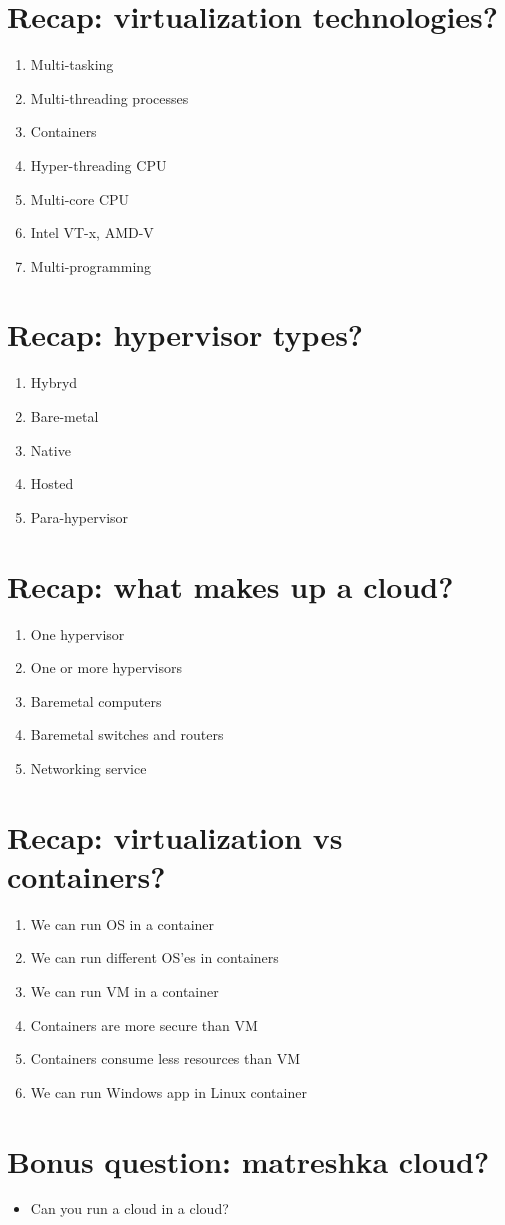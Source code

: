 \documentclass[11pt]{article}
\begin{document}
\section*{Recap: virtualization technologies?}
\label{sec:orgd8e064c}
\begin{enumerate}
\item Multi-tasking
\item Multi-threading processes
\item Containers
\item Hyper-threading CPU
\item Multi-core CPU
\item Intel VT-x, AMD-V
\item Multi-programming
\end{enumerate}

\section*{Recap: hypervisor types?}
\label{sec:org2d754bf}
\begin{enumerate}
\item Hybryd
\item Bare-metal
\item Native
\item Hosted
\item Para-hypervisor
\end{enumerate}

\section*{Recap: what makes up a cloud?}
\label{sec:org359c1ab}
\begin{enumerate}
\item One hypervisor
\item One or more hypervisors
\item Baremetal computers
\item Baremetal switches and routers
\item Networking service
\end{enumerate}

\section*{Recap: virtualization vs containers?}
\label{sec:orga852fc0}
\begin{enumerate}
\item We can run OS in a container
\item We can run different OS'es in containers
\item We can run VM in a container
\item Containers are more secure than VM
\item Containers consume less resources than VM
\item We can run Windows app in Linux container
\end{enumerate}

\section*{Bonus question: matreshka cloud?}
\label{sec:org356476b}
\begin{itemize}
\item Can you run a cloud in a cloud?
\end{itemize}
\end{document}
